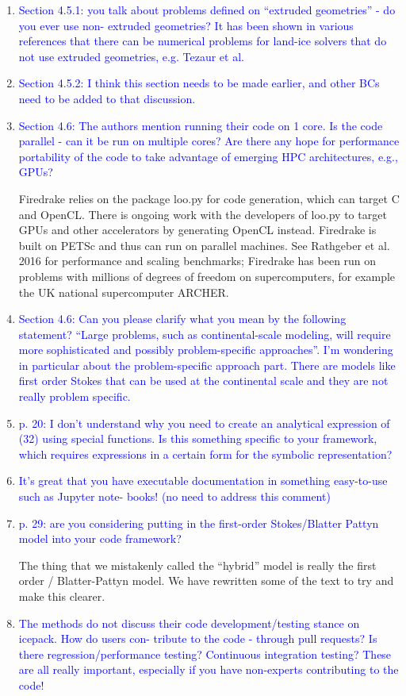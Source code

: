 \documentclass{article}
\theoremstyle{definition}
\theoremstyle{plain}
\begin{document}
\begin{enumerate}
{so it is clear.}
\item \textcolor{blue}{Section 4.5.1: you talk about problems defined on “extruded geometries” - do you ever use non-
extruded geometries? It has been shown in various references that there can be numerical problems
for land-ice solvers that do not use extruded geometries, e.g. Tezaur et al.}
\item \textcolor{blue}{Section 4.5.2: I think this section needs to be made earlier, and other BCs need to be added to that
discussion.}
\item \textcolor{blue}{Section 4.6: The authors mention running their code on 1 core. Is the code parallel - can it be run
on multiple cores? Are there any hope for performance portability of the code to take advantage of
emerging HPC architectures, e.g., GPUs?}

Firedrake relies on the package loo.py for code generation, which can target C and OpenCL.
There is ongoing work with the developers of loo.py to target GPUs and other accelerators by generating OpenCL instead.
Firedrake is built on PETSc and thus can run on parallel machines.
See Rathgeber et al. 2016 for performance and scaling benchmarks; Firedrake has been run on problems with millions of degrees of freedom on supercomputers, for example the UK national supercomputer ARCHER.

\item \textcolor{blue}{Section 4.6: Can you please clarify what you mean by the following statement? “Large problems,
such as continental-scale modeling, will require more sophisticated and possibly problem-specific
approaches”. I’m wondering in particular about the problem-specific approach part. There are
models like first order Stokes that can be used at the continental scale and they are not really
problem specific.}
\item \textcolor{blue}{p. 20: I don’t understand why you need to create an analytical expression of (32) using special
functions. Is this something specific to your framework, which requires expressions in a certain form
for the symbolic representation?}
\item \textcolor{blue}{It’s great that you have executable documentation in something easy-to-use such as Jupyter note-
books! (no need to address this comment)}
\item \textcolor{blue}{p. 29: are you considering putting in the first-order Stokes/Blatter Pattyn model into your code
framework?}

The thing that we mistakenly called the ``hybrid'' model is really the first order / Blatter-Pattyn model.
We have rewritten some of the text to try and make this clearer.
\item \textcolor{blue}{The methods do not discuss their code development/testing stance on icepack. How do users con-
tribute to the code - through pull requests? Is there regression/performance testing? Continuous
integration testing? These are all really important, especially if you have non-experts contributing
to the code!}
\end{enumerate}
\end{document}
